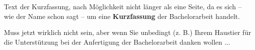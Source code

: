 %
%
%
%
%
\seAbstract{} %




%
%
\seKurzfassung{} %


Text der Kurzfassung, nach Möglichkeit nicht länger als eine Seite, da es sich -- wie der Name schon 
sagt -- um eine 
\textbf{Kurzfassung} der Bachelorarbeit handelt.



Muss jetzt wirklich nicht sein, aber wenn Sie unbedingt (z. B.) Ihrem Haustier f\"ur die Unterst\"utzung bei 
der Anfertigung der Bachelorarbeit danken wollen ...





%
%
%
%
\seInhaltsverzeichnis[%
einrueckung=ja,
gliederungsebenen=4
]




%
%
%
%



